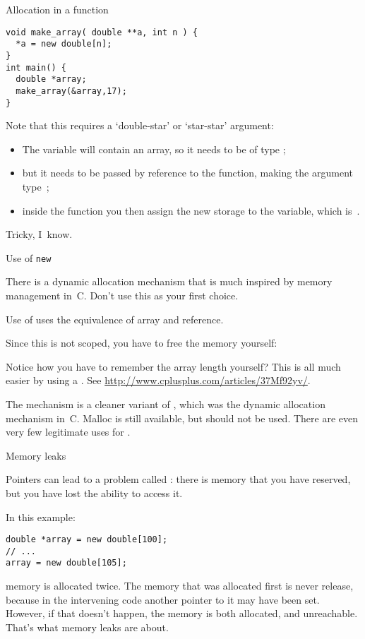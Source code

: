 \begin{block}{Allocation in a function}
\begin{verbatim}
void make_array( double **a, int n ) {
  *a = new double[n];
}
int main() {
  double *array;
  make_array(&array,17);
}
\end{verbatim}
\end{block}

Note that this requires a `double-star' or `star-star' argument:
\begin{itemize}
\item The variable  will contain an array, so it needs to be of
  type ;
\item but it needs to be passed by reference to the function, making
  the argument type~;
\item inside the function you then assign the new storage to the
   variable, which is~.
\end{itemize}
Tricky, I~know.

 {Use of \texttt{new}}
\label{sec:cnew}

\prerequisite{\ref{sec:arraypointer}}

There is a dynamic allocation mechanism that is much inspired by
memory management in~C. Don't use this as your first choice.

Use of  uses the 
equivalence of array and reference.
%

Since this is not scoped, you have to free the memory yourself:
%

Notice how you have to remember the array length yourself? This is all
much easier by using a . See
\url{http://www.cplusplus.com/articles/37Mf92yv/}.

The  mechanism is a cleaner variant of ,
which was the dynamic allocation mechanism in~C. Malloc is still
available, but should not be used. There are even very few legitimate
uses for .


 {Memory leaks}
\label{sec:memleak}

Pointers can lead to a problem called :
there is memory that you have reserved, but you have lost the ability
to access it.

In this example:
\begin{verbatim}
double *array = new double[100];
// ...
array = new double[105];
\end{verbatim}
memory is allocated twice. The memory that was allocated first is
never release, because in the intervening code another pointer to it
may have been set. However, if that doesn't happen, the memory is both
allocated, and unreachable. That's what memory leaks are about.


